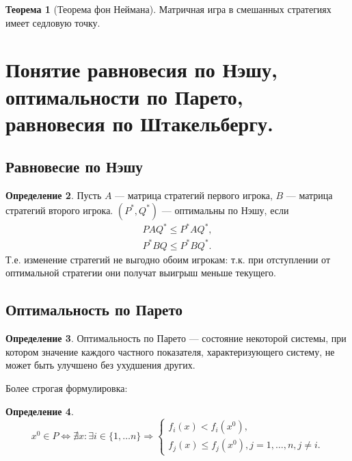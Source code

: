 \documentclass[12pt]{report}
\theoremstyle{definition}
\newtheorem{theorem}{Теорема}[chapter]
\newtheorem{definition}[theorem]{Определение}
\begin{document}
\begin{theorem}[Теорема фон Неймана]
Матричная игра в смешанных стратегиях имеет седловую точку.
\end{theorem}


\section
{
  Понятие равновесия по Нэшу, оптимальности по Парето,
  равновесия по Штакельбергу.
}

\subsection{Равновесие по Нэшу}

\begin{definition}
Пусть $A$ --- матрица стратегий первого игрока, $B$ --- матрица
стратегий второго игрока. $(P^*, Q^*)$ --- оптимальны по Нэшу,
если
\begin{gather*}
PAQ^* \le P^*AQ^*, \\
P^*BQ \le P^*BQ^*.
\end{gather*}
Т.е. изменение стратегий не выгодно обоим игрокам: т.к.
при отступлении от оптимальной стратегии они получат выигрыш
меньше текущего.
\end{definition}

\subsection{Оптимальность по Парето}

\begin{definition}
Оптимальность по Парето --- состояние некоторой системы,
при котором значение каждого частного показателя, характеризующего
систему, не может быть улучшено без ухудшения других.
\end{definition}

Более строгая формулировка:
\begin{definition}
$$
x^0 \in P \Leftrightarrow \nexists x: \exists i \in \{1, \dots n\}
\Rightarrow
\begin{cases}
f_i(x) < f_i(x^0), \\
f_j(x) \le f_j(x^0), j = 1, \dots, n, j \ne i.
\end{cases}
$$
\end{definition}
\end{document}
